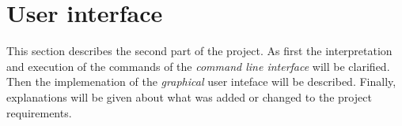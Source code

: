 \section{User interface} %
\label{sec:user_interface}
This section describes the second part of the project.
As first the interpretation and execution of the commands of 
the \emph{command line interface} will be clarified.
Then the implemenation of the \emph{graphical} user inteface
will be described.
Finally, explanations will be given about what was added or changed
to the project requirements.


\newpage

\newpage

